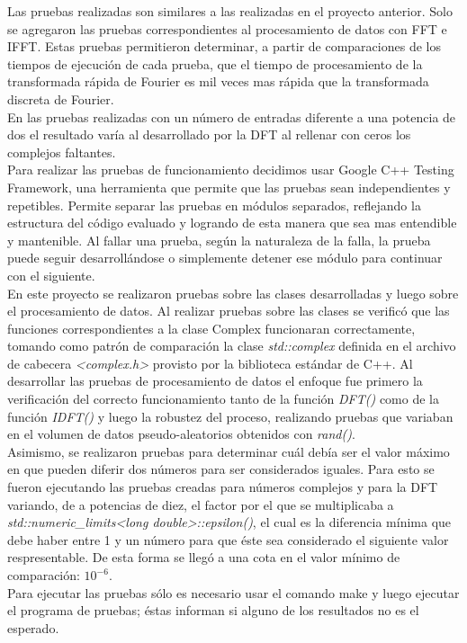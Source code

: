 \documentclass[12pt,a4paper]{report}
\begin{document}
		\indent Las pruebas realizadas son similares a las realizadas en el proyecto anterior. Solo se agregaron las pruebas 
		correspondientes al procesamiento de datos con FFT e IFFT. Estas pruebas permitieron determinar, a partir de comparaciones
		de los tiempos de ejecución de cada prueba, que el tiempo de procesamiento de la transformada rápida de Fourier es mil 
		veces mas rápida que la transformada discreta de Fourier. 
		\\
		\indent En las pruebas realizadas con un número de entradas diferente a una potencia de dos el resultado varía al 
		desarrollado por la DFT al rellenar con ceros los complejos faltantes.
		\\	
		\indent Para realizar las pruebas de funcionamiento decidimos usar Google C++ Testing Framework, una herramienta que 
		permite que las pruebas sean independientes y repetibles. Permite separar las pruebas en módulos separados, reflejando 
		la estructura del código evaluado y logrando de esta manera que sea mas entendible y mantenible. Al fallar una prueba, 
		según la naturaleza de la falla, la prueba puede seguir desarrollándose o simplemente detener ese módulo para continuar 
		con el siguiente. 	
		\\
		\indent En este proyecto se realizaron pruebas sobre las clases desarrolladas y luego sobre el procesamiento de datos.
		Al realizar pruebas sobre las clases se verificó que las funciones correspondientes a la clase Complex funcionaran 
		correctamente, tomando como patrón de comparación la clase \textit{std::complex} definida en el archivo de cabecera
		\textit{<complex.h>} provisto por la biblioteca estándar de C++. Al desarrollar las pruebas de procesamiento de datos 
		el enfoque fue primero la verificación del correcto funcionamiento tanto de la función \textit{DFT()} como de la 
		función \textit{IDFT()} y luego la robustez del proceso, realizando pruebas que variaban en el volumen de datos 
		pseudo-aleatorios obtenidos con \textit{rand()}.
		\\
		\indent Asimismo, se realizaron pruebas para determinar cuál debía ser el valor máximo en que pueden diferir dos números
		para ser considerados iguales. Para esto se fueron ejecutando las pruebas creadas para números complejos y para la DFT variando,
		de a potencias de diez, el factor por el que se multiplicaba a \textit{std::numeric\_limits<long double>::epsilon()}, el cual es
		la diferencia mínima que debe	haber	entre 1 y un número para que éste sea considerado el siguiente valor respresentable. 
		De esta forma se llegó a una cota en el valor mínimo de comparación: $10^{-6}$.
		\\
		\indent Para ejecutar las pruebas sólo es necesario usar el comando make y luego ejecutar el programa de pruebas;
		éstas informan si alguno de los resultados no es el esperado.
\end{document}
